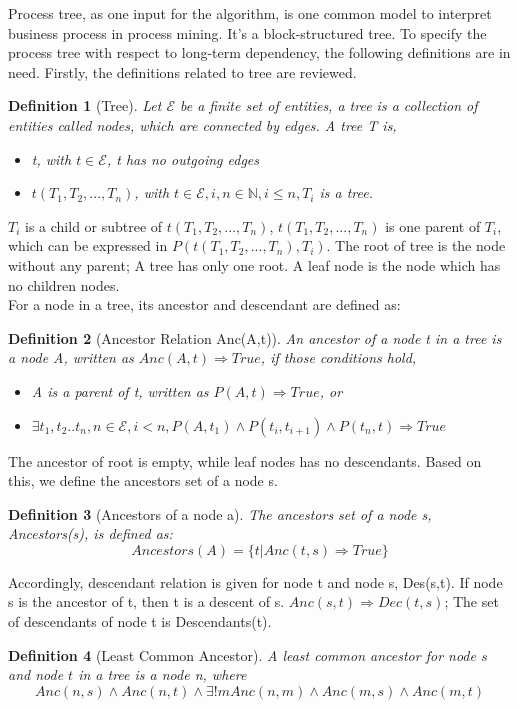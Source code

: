 \documentclass[]{article}
\newtheorem{mydef}{Definition}[section]
\begin{document}
Process tree, as one input for the algorithm, is one common model to interpret business process in process mining. It's a block-structured tree. To specify the process tree with respect to long-term dependency, the following definitions are in need. Firstly, the definitions related to tree are reviewed.
\begin{mydef}[Tree]
	Let $ \mathscr{E} $ be a finite set of entities, a tree is a collection of entities called nodes, which are connected by edges. A tree T is,
	
	\begin{itemize}
		\item t, with  $t\in \mathscr{E}$, t has no outgoing edges
		\item $t(T_1,T_2,...,T_n)$, with $t\in \mathscr{E}, i,n\in \mathbb{N}, i \leq n ,T_i$ is a tree.
	\end{itemize}
\end{mydef}
$T_i$ is a child or subtree of $t(T_1,T_2,...,T_n)$, $t(T_1,T_2,...,T_n)$ is one parent of $T_i$, which can be expressed in $P(t(T_1,T_2,...,T_n),T_i)$. The root of tree is the node without any parent; A tree has only one root. A leaf node is the node which has no children nodes.\\
For a node in a tree, its ancestor and descendant are defined as:
\begin{mydef}[Ancestor Relation Anc(A,t)]
	An ancestor of a node t in a tree is a node A, written as $ Anc(A,t) \Rightarrow True$, if those conditions hold,  
	\begin{itemize}
		\item A is a parent of t, written as $ P(A,t) \Rightarrow True$, or
		\item $\exists t_1,t_2..t_n,n\in \mathscr{E}, i < n, P(A,t_1)\land P(t_i,t_{i+1}) \land P(t_n,t) \Rightarrow True $
	\end{itemize}
\end{mydef}
The ancestor of root is empty, while leaf nodes has no descendants. Based on this, we define the ancestors set of a node s. 
\begin{mydef}[Ancestors of a node a]
	The ancestors set of a node s, Ancestors(s), is defined as: \[ Ancestors(A)=\{t|Anc(t,s) \Rightarrow True \} \]
\end{mydef}
Accordingly, descendant relation is given for node t and node s, Des(s,t). If node s is the ancestor of t, then t is a descent of s. $Anc(s,t) \Rightarrow Dec(t,s)$; The set of descendants of node t is Descendants(t).
\begin{mydef}[Least Common Ancestor]
	A least common ancestor for node $s$ and node $t$ in a tree is a node n, where 
	\[Anc(n,s) \land Anc(n,t) \land \exists! m Anc(n,m) \land Anc(m,s) \land Anc(m,t) \]
\end{mydef}
\end{document}
